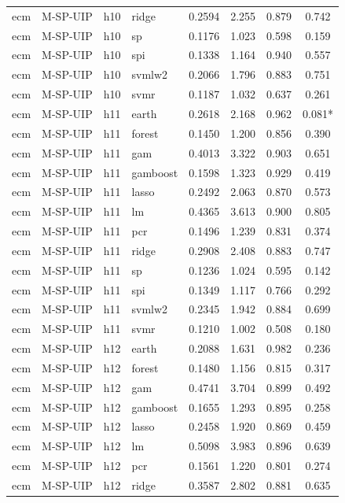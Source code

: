 \begin{ThreePartTable}
\begin{longtable}[t]{llclcccc}
ecm & M-SP-UIP & h10 & ridge & 0.2594 & 2.255 & 0.879 & 0.742\\
ecm & M-SP-UIP & h10 & sp & 0.1176 & 1.023 & 0.598 & 0.159\\
ecm & M-SP-UIP & h10 & spi & 0.1338 & 1.164 & 0.940 & 0.557\\
ecm & M-SP-UIP & h10 & svmlw2 & 0.2066 & 1.796 & 0.883 & 0.751\\
ecm & M-SP-UIP & h10 & svmr & 0.1187 & 1.032 & 0.637 & 0.261\\
\addlinespace
ecm & M-SP-UIP & h11 & earth & 0.2618 & 2.168 & 0.962 & 0.081*\\
ecm & M-SP-UIP & h11 & forest & 0.1450 & 1.200 & 0.856 & 0.390\\
ecm & M-SP-UIP & h11 & gam & 0.4013 & 3.322 & 0.903 & 0.651\\
ecm & M-SP-UIP & h11 & gamboost & 0.1598 & 1.323 & 0.929 & 0.419\\
ecm & M-SP-UIP & h11 & lasso & 0.2492 & 2.063 & 0.870 & 0.573\\
ecm & M-SP-UIP & h11 & lm & 0.4365 & 3.613 & 0.900 & 0.805\\
ecm & M-SP-UIP & h11 & pcr & 0.1496 & 1.239 & 0.831 & 0.374\\
ecm & M-SP-UIP & h11 & ridge & 0.2908 & 2.408 & 0.883 & 0.747\\
ecm & M-SP-UIP & h11 & sp & 0.1236 & 1.024 & 0.595 & 0.142\\
ecm & M-SP-UIP & h11 & spi & 0.1349 & 1.117 & 0.766 & 0.292\\
ecm & M-SP-UIP & h11 & svmlw2 & 0.2345 & 1.942 & 0.884 & 0.699\\
ecm & M-SP-UIP & h11 & svmr & 0.1210 & 1.002 & 0.508 & 0.180\\
\addlinespace
ecm & M-SP-UIP & h12 & earth & 0.2088 & 1.631 & 0.982 & 0.236\\
ecm & M-SP-UIP & h12 & forest & 0.1480 & 1.156 & 0.815 & 0.317\\
ecm & M-SP-UIP & h12 & gam & 0.4741 & 3.704 & 0.899 & 0.492\\
ecm & M-SP-UIP & h12 & gamboost & 0.1655 & 1.293 & 0.895 & 0.258\\
ecm & M-SP-UIP & h12 & lasso & 0.2458 & 1.920 & 0.869 & 0.459\\
ecm & M-SP-UIP & h12 & lm & 0.5098 & 3.983 & 0.896 & 0.639\\
ecm & M-SP-UIP & h12 & pcr & 0.1561 & 1.220 & 0.801 & 0.274\\
ecm & M-SP-UIP & h12 & ridge & 0.3587 & 2.802 & 0.881 & 0.635\\

\end{longtable}
\end{ThreePartTable}
